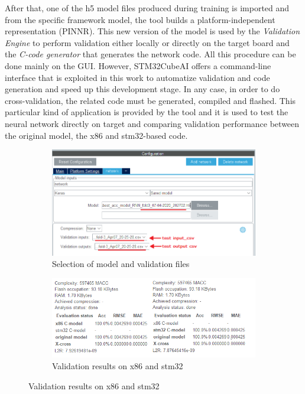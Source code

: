 After that, one of the h5 model files produced during training is imported and from the specific framework model, the tool builds a platform-independent representation (PINNR).\newline 
This new version of the model is used by the \textit{Validation Engine} to perform validation either locally or directly on the target board and the \textit{C-code generator} that generates the network code. All this procedure can be done mainly on the GUI. However, STM32CubeAI offers a command-line interface that is exploited in this work to automatize validation and code generation and speed up this development stage.\newline
In any case, in order to do cross-validation, the related code must be generated, compiled and flashed. This particular kind of application is provided by the tool and it is used to test the neural network directly on target and comparing validation performance between the original model, the x86 and stm32-based code.
\begin{center}
	\begin{figure}[H]
		\begin{subfigure}[H]{0.45\textwidth}
			\hfill\includegraphics[scale=0.55]{figures/validation_gui.png}\hspace*{\fill}
			\caption{Selection of model and validation files}\label{fig:21a}
		\end{subfigure}
	\hfill
		\begin{subfigure}[H]{0.45\textwidth}
			\hfill\includegraphics[scale=0.7]{figures/x86_stm32_validation.png}\hspace*{\fill}
			\caption{Validation results on x86 and stm32}\label{fig:21b}
		\end{subfigure}
	\end{figure}
\end{center}
